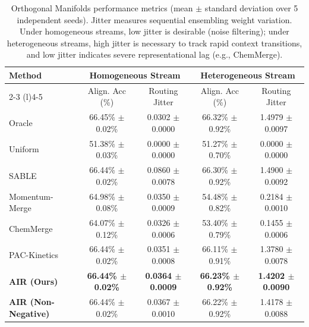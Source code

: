 \begin{table}[t]
\caption{Orthogonal Manifolds performance metrics (mean $\pm$ standard deviation over 5 independent seeds). Jitter measures sequential ensembling weight variation. Under homogeneous streams, low jitter is desirable (noise filtering); under heterogeneous streams, high jitter is necessary to track rapid context transitions, and low jitter indicates severe representational lag (e.g., ChemMerge).}
\label{tab:orthogonal_results}
\vskip 0.1in
\begin{center}
\begin{small}
\begin{sc}
\setlength{\tabcolsep}{2pt}
\begin{tabular}{lcccc}
\toprule
Method & \multicolumn{2}{c}{Homogeneous Stream} & \multicolumn{2}{c}{Heterogeneous Stream} \\
\cmidrule(r){2-3} \cmidrule(l){4-5}
& Align. Acc (\%) & Routing Jitter & Align. Acc (\%) & Routing Jitter \\
\midrule
Oracle & 66.45\% $\pm$ 0.02\% & 0.0302 $\pm$ 0.0000 & 66.32\% $\pm$ 0.92\% & 1.4979 $\pm$ 0.0097 \\
Uniform & 51.38\% $\pm$ 0.03\% & 0.0000 $\pm$ 0.0000 & 51.27\% $\pm$ 0.70\% & 0.0000 $\pm$ 0.0000 \\
SABLE \cite{sable2024} & 66.44\% $\pm$ 0.02\% & 0.0860 $\pm$ 0.0078 & 66.30\% $\pm$ 0.92\% & 1.4900 $\pm$ 0.0092 \\
Momentum-Merge \cite{momentummerge2025} & 64.98\% $\pm$ 0.08\% & 0.0350 $\pm$ 0.0009 & 54.48\% $\pm$ 0.82\% & 0.2184 $\pm$ 0.0010 \\
ChemMerge \cite{chemmerge2025} & 64.07\% $\pm$ 0.12\% & 0.0326 $\pm$ 0.0006 & 53.40\% $\pm$ 0.79\% & 0.1455 $\pm$ 0.0006 \\
PAC-Kinetics \cite{packinetics2025} & 66.44\% $\pm$ 0.02\% & 0.0351 $\pm$ 0.0008 & 66.11\% $\pm$ 0.91\% & 1.3780 $\pm$ 0.0078 \\
\midrule
\textbf{AIR (Ours)} & \textbf{66.44\% $\pm$ 0.02\%} & \textbf{0.0364 $\pm$ 0.0009} & \textbf{66.23\% $\pm$ 0.92\%} & \textbf{1.4202 $\pm$ 0.0090} \\
\textbf{AIR (Non-Negative)} & 66.44\% $\pm$ 0.02\% & 0.0367 $\pm$ 0.0010 & 66.22\% $\pm$ 0.92\% & 1.4178 $\pm$ 0.0088 \\
\bottomrule
\end{tabular}
\end{sc}
\end{small}
\end{center}
\vskip -0.1in
\end{table}

